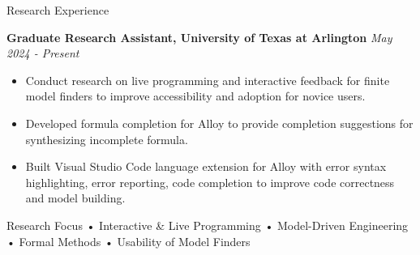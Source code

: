 \begin{rSection}{Research Experience}

    {\bf Graduate Research Assistant, University of Texas at Arlington} \hfill {\em May 2024 - Present}
    \begin{itemize}[noitemsep]
        \item Conduct research on live programming and interactive feedback for finite model finders to improve accessibility and adoption for novice users.
        \item Developed formula completion for Alloy to provide completion suggestions for synthesizing incomplete formula.
        \item Built Visual Studio Code language extension for Alloy with error syntax highlighting, error reporting, code completion to improve code correctness and model building.
    \end{itemize}

    \begin{rSection}{Research Focus}
        • Interactive \& Live Programming • Model-Driven Engineering • Formal Methods • Usability of Model Finders
    \end{rSection}




\end{rSection}
